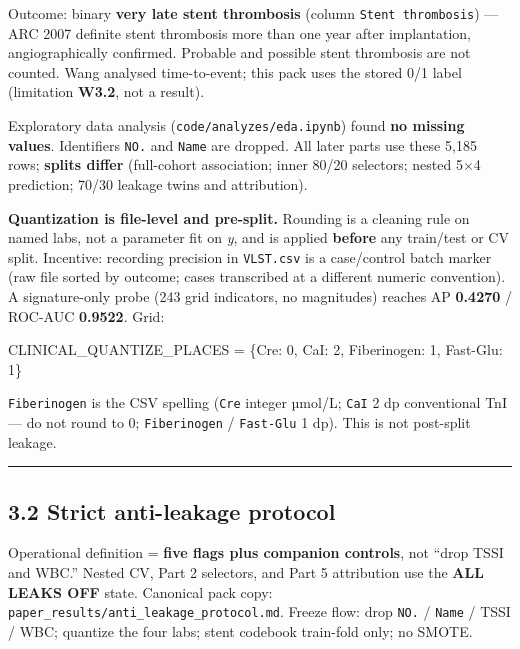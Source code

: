 \documentclass[
]{article}
\newenvironment{Shaded}{}{}
\newcommand{\NormalTok}[1]{#1}
\begin{document}
Outcome: binary \textbf{very late stent thrombosis} (column
\texttt{Stent\ thrombosis}) --- ARC 2007 definite stent thrombosis more
than one year after implantation, angiographically confirmed. Probable
and possible stent thrombosis are not counted. Wang analysed
time-to-event; this pack uses the stored 0/1 label (limitation
\textbf{W3.2}, not a result).

Exploratory data analysis (\texttt{code/analyzes/eda.ipynb}) found
\textbf{no missing values}. Identifiers \texttt{NO.} and \texttt{Name}
are dropped. All later parts use these 5,185 rows; \textbf{splits
differ} (full-cohort association; inner 80/20 selectors; nested 5×4
prediction; 70/30 leakage twins and attribution).

\textbf{Quantization is file-level and pre-split.} Rounding is a
cleaning rule on named labs, not a parameter fit on \emph{y}, and is
applied \textbf{before} any train/test or CV split. Incentive: recording
precision in \texttt{VLST.csv} is a case/control batch marker (raw file
sorted by outcome; cases transcribed at a different numeric convention).
A signature-only probe (243 grid indicators, no magnitudes) reaches AP
\textbf{0.4270} / ROC-AUC \textbf{0.9522}. Grid:

\begin{Shaded}
\begin{Highlighting}[]
\NormalTok{CLINICAL\_QUANTIZE\_PLACES = \{Cre: 0, CaI: 2, Fiberinogen: 1, Fast{-}Glu: 1\}}
\end{Highlighting}
\end{Shaded}

\texttt{Fiberinogen} is the CSV spelling (\texttt{Cre} integer µmol/L;
\texttt{CaI} 2 dp conventional TnI --- do not round to 0;
\texttt{Fiberinogen} / \texttt{Fast-Glu} 1 dp). This is not post-split
leakage.

\begin{center}\rule{0.5\linewidth}{0.5pt}\end{center}

\subsection{3.2 Strict anti-leakage
protocol}\label{strict-anti-leakage-protocol}

Operational definition = \textbf{five flags plus companion controls},
not ``drop TSSI and WBC.'' Nested CV, Part 2 selectors, and Part 5
attribution use the \textbf{ALL LEAKS OFF} state. Canonical pack copy:
\texttt{paper\_results/anti\_leakage\_protocol.md}. Freeze flow: drop
\texttt{NO.} / \texttt{Name} / TSSI / WBC; quantize the four labs; stent
codebook train-fold only; no SMOTE.
\end{document}
